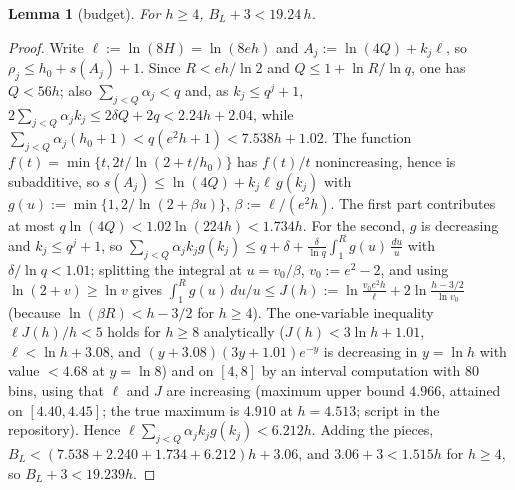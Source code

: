 \documentclass[11pt]{article}
\newtheorem{lemma}[theorem]{Lemma}
\theoremstyle{definition}
\begin{document}
\begin{lemma}[budget]\label{lem:budget20}
For $h\ge4$, $B_L+3<19.24\,h$.
\end{lemma}
\begin{proof}
Write $\ell:=\ln(8H)=\ln(8eh)$ and $A_j:=\ln(4Q)+k_j\ell$, so $\rho_j\le h_0+s(A_j)+1$. Since $R<eh/\ln2$ and $Q\le1+\ln R/\ln q$,
one has $Q<56h$; also $\sum_{j<Q}\alpha_j<q$ and, as $k_j\le q^j+1$, $2\sum_{j<Q}\alpha_jk_j\le2\delta Q+2q<2.24h+2.04$, while
$\sum_{j<Q}\alpha_j(h_0+1)<q(e^2h+1)<7.538h+1.02$. The function $f(t)=\min\{t,2t/\ln(2+t/h_0)\}$ has $f(t)/t$ nonincreasing,
hence is subadditive, so $s(A_j)\le\ln(4Q)+k_j\ell\,g(k_j)$ with $g(u):=\min\{1,2/\ln(2+\beta u)\}$, $\beta:=\ell/(e^2h)$.
The first part contributes at most $q\ln(4Q)<1.02\ln(224h)<1.734h$. For the second, $g$ is decreasing and $k_j\le q^j+1$, so
$\sum_{j<Q}\alpha_jk_jg(k_j)\le q+\delta+\frac{\delta}{\ln q}\int_1^Rg(u)\,\frac{du}u$ with $\delta/\ln q<1.01$; splitting the
integral at $u=v_0/\beta$, $v_0:=e^2-2$, and using $\ln(2+v)\ge\ln v$ gives
$\int_1^Rg(u)\,du/u\le J(h):=\ln\frac{v_0e^2h}{\ell}+2\ln\frac{h-3/2}{\ln v_0}$ (because $\ln(\beta R)<h-3/2$ for $h\ge4$).
The one-variable inequality $\ell J(h)/h<5$ holds for $h\ge8$ analytically ($J(h)<3\ln h+1.01$, $\ell<\ln h+3.08$, and
$(y+3.08)(3y+1.01)e^{-y}$ is decreasing in $y=\ln h$ with value $<4.68$ at $y=\ln8$) and on $[4,8]$ by an interval computation with
$80$ bins, using that $\ell$ and $J$ are increasing (maximum upper bound $4.966$, attained on $[4.40,4.45]$; the true maximum is
$4.910$ at $h=4.513$; script in the repository). Hence
$\ell\sum_{j<Q}\alpha_jk_jg(k_j)<6.212h$. Adding the pieces, $B_L<(7.538+2.240+1.734+6.212)h+3.06$, and $3.06+3<1.515h$ for $h\ge4$,
so $B_L+3<19.239h$.
\end{proof}
\end{document}
